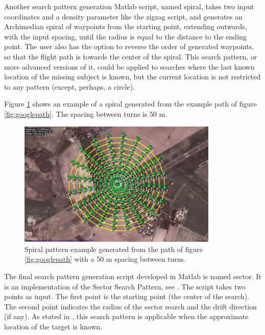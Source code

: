 Another search pattern generation Matlab script, named spiral, takes two input coordinates and a
density parameter like the zigzag script, and generates an Archimedian spiral of waypoints from the
starting point, extending outwards, with the input spacing, until the radius is equal to the
distance to the ending point. The user also has the option to reverse the order of generated waypoints,
so that the flight path is towards the center of the spiral.
This search pattern, or more advanced versions of it, could be applied to searches where the last known
location of the missing subject is known, but the current location is not restricted to any pattern
(except, perhaps, a circle).

Figure \ref{fig:spiral50m} shows an example of a spiral generated from the example path of figure
\ref{fig:googlepath}. The spacing between turns is 50 m.
\begin{figure}[ht]
	\centering
	\includegraphics[width=0.85\textwidth]{Images/spiral50m}
	\caption[Spiral pattern example.]{Spiral pattern example generated from the path of figure
		\ref{fig:googlepath} with a 50 m spacing between turns.}
	\label{fig:spiral50m}
\end{figure}

The final search pattern generation script developed in Matlab is named sector.
It is an implementation of the Sector Search Pattern, see \cite{Ref:sarfundamentals}.
The script takes two points as input. The first point is the starting point (the center of the search).
The second point indicates the radius of the sector search and the drift direction (if any).
As stated in \cite{Ref:sarfundamentals}, this search pattern is applicable when the approximate location
of the target is known.

